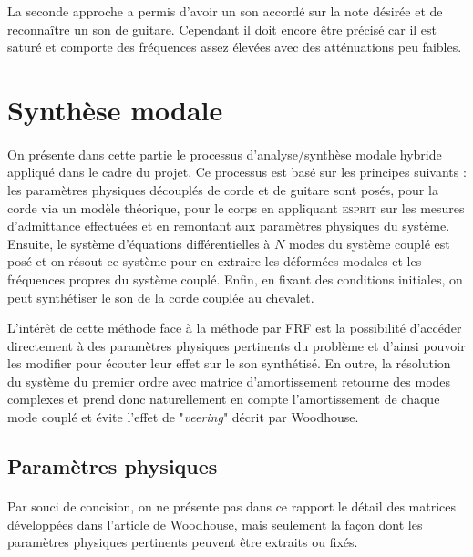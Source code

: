 La seconde approche a permis d'avoir un son accordé sur la note désirée et de
reconnaître un son de guitare. Cependant il doit encore être précisé car il est
saturé et comporte des fréquences assez élevées avec des atténuations peu
faibles.


%
%
%
%


\section{Synthèse modale}

\paragraph{}
  On présente dans cette partie le processus d'analyse/synthèse modale hybride
appliqué dans le cadre du projet. Ce processus est basé sur les principes
suivants : les paramètres physiques découplés de corde et de guitare sont
posés, pour la corde via un modèle théorique, pour le corps en appliquant
\textsc{esprit} sur les mesures d'admittance effectuées et en remontant aux
paramètres physiques du système.
  Ensuite, le système d'équations différentielles à \( N \) modes du système
couplé est posé et on résout ce système pour en extraire les déformées modales
et les fréquences propres du système couplé. Enfin, en fixant des
conditions initiales, on peut synthétiser le son de la corde couplée au
chevalet.

  L'intérêt de cette méthode face à la méthode par FRF est la possibilité
d'accéder directement à des paramètres physiques pertinents du problème et
d'ainsi pouvoir les modifier pour écouter leur effet sur le son synthétisé.
  En outre, la résolution du système du premier ordre avec matrice
d'amortissement retourne des modes complexes et prend donc naturellement en
compte l'amortissement de chaque mode couplé et évite l'effet de
"\emph{veering}" décrit par Woodhouse.

\subsection{Paramètres physiques}

\paragraph{}
  Par souci de concision, on ne présente pas dans ce rapport le détail des
matrices développées dans l'article de Woodhouse, mais seulement la façon dont
les paramètres physiques pertinents peuvent être extraits ou fixés.


